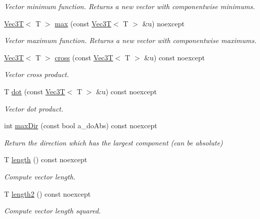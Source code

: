 \begin{DoxyCompactItemize}
\begin{DoxyCompactList}\small\item\em Vector minimum function. Returns a new vector with componentwise minimums. \end{DoxyCompactList}\item 
\hyperlink{classVec3T}{Vec3T}$<$ T $>$ \hyperlink{classVec3T_ac126bbdaeff79e475327887bfa8aa62c}{max} (const \hyperlink{classVec3T}{Vec3T}$<$ T $>$ \&u) noexcept
\begin{DoxyCompactList}\small\item\em Vector maximum function. Returns a new vector with componentwise maximums. \end{DoxyCompactList}\item 
\hyperlink{classVec3T}{Vec3T}$<$ T $>$ \hyperlink{classVec3T_af628d2d42a93200a929bd54a1fe8353f}{cross} (const \hyperlink{classVec3T}{Vec3T}$<$ T $>$ \&u) const noexcept
\begin{DoxyCompactList}\small\item\em Vector cross product. \end{DoxyCompactList}\item 
T \hyperlink{classVec3T_ab4bebdfbdc863826a1a7e86cad130ff8}{dot} (const \hyperlink{classVec3T}{Vec3T}$<$ T $>$ \&u) const noexcept
\begin{DoxyCompactList}\small\item\em Vector dot product. \end{DoxyCompactList}\item 
int \hyperlink{classVec3T_a292391c1f72ca66e100e7e70512ff9b1}{max\+Dir} (const bool a\+\_\+do\+Abs) const noexcept
\begin{DoxyCompactList}\small\item\em Return the direction which has the largest component (can be absolute) \end{DoxyCompactList}\item 
T \hyperlink{classVec3T_a93c868b181e24a4f74702a8b8a36f815}{length} () const noexcept
\begin{DoxyCompactList}\small\item\em Compute vector length. \end{DoxyCompactList}\item 
T \hyperlink{classVec3T_aaed89aee434cfa0abd86fe33bff49b4e}{length2} () const noexcept
\begin{DoxyCompactList}\small\item\em Compute vector length squared. \end{DoxyCompactList}\end{DoxyCompactItemize}
